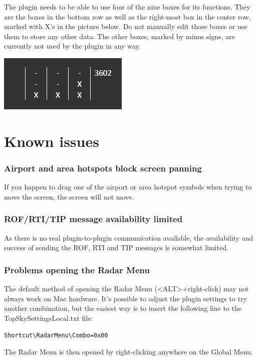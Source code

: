 \documentclass[11pt,a4paper,oldfontcommands]{memoir}
\begin{document}
The plugin needs to be able to use four of the nine boxes for its functions. They are the boxes in the bottom row as well as the right-most box in the center row, marked with X’s in the picture below. Do not manually edit those boxes or use them to store any other data. The other boxes, marked by minus signs, are currently not used by the plugin in any way.

\includegraphics{img/strip.png}

\chapter{Known issues}

\subsection*{Airport and area hotspots block screen panning}

If you happen to drag one of the airport or area hotspot symbols when trying to move the screen, the screen will not move.

\subsection*{ROF/RTI/TIP message availability limited}

As there is no real plugin-to-plugin communication available, the availability and success of sending the ROF, RTI and TIP messages is somewhat limited.

\subsection*{Problems opening the Radar Menu}

The default method of opening the Radar Menu (<ALT>+right-click) may not always work on Mac hardware. It’s possible to adjust the plugin settings to try another combination, but the easiest way is to insert the following line to the TopSkySettingsLocal.txt file:

\verb|Shortcut\RadarMenu\Combo=0x00|

The Radar Menu is then opened by right-clicking anywhere on the Global Menu.
\end{document}
